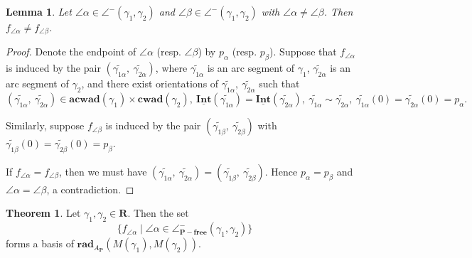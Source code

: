 \documentclass[a4paper,10pt]{amsart}
\theoremstyle{plain}          %
\newtheorem{lemma}[theorem]{Lemma}
\theoremstyle{definition}
\newtheorem{thm}[theorem]{Theorem}
\def\PP{\mathbf{P}}
\newcommand{\Intv}{\underline{\mathbf{Int}}}
\newcommand{\apfree}{\angle^-_{\mathbf{P-free}}}
\newcommand{\aad}{\mathbf{acwad}}
\newcommand{\cad}{\mathbf{cwad}}
\begin{document}
\begin{lemma}\label{l:mor determined by angle}
Let $\angle\alpha\in \angle^{-}(\gamma_1,\gamma_2)$  and $\angle \beta\in \angle^{-}(\gamma_1,\gamma_2)$ with $\angle\alpha\neq\angle \beta$. Then $f_{\angle\alpha}\neq f_{\angle \beta}$. 
\end{lemma}
\begin{proof}
Denote the endpoint of $\angle\alpha$ (resp. $\angle\beta$) by $p_\alpha$ (resp.  $p_\beta$).
   Suppose that  $f_{\angle\alpha}$ is induced by the pair $(\widetilde{\gamma_{1\alpha}},~\widetilde{\gamma_{2\alpha}})$, where $\widetilde{\gamma_{1\alpha}}$ is an arc segment of $\gamma_1$,  $\widetilde{\gamma_{2\alpha}}$ is an arc segment of $\gamma_2$, and there exist orientations of  $\widetilde{\gamma_{1\alpha}},~\widetilde{\gamma_{2\alpha}}$  such that 
\[(\widetilde{\gamma_{1\alpha}},~\widetilde{\gamma_{2\alpha}})\in\aad(\gamma_1)\times\cad(\gamma_2), ~\Intv(\widetilde{\gamma_{1\alpha}})=\Intv(\widetilde{\gamma_{2\alpha}}), ~\widetilde{\gamma_{1\alpha}}\sim\widetilde{\gamma_{2\alpha}}, ~\widetilde{\gamma_{1\alpha}}(0)=\widetilde{\gamma_{2\alpha}}(0)=p_{\alpha}.\]

Similarly, suppose $f_{\angle\beta}$ is induced by the  pair $(\widetilde{\gamma_{1\beta}},~\widetilde{\gamma_{2\beta}})$ with $\widetilde{\gamma_{1\beta}}(0)=\widetilde{\gamma_{2\beta}}(0)=p_{\beta}.$

If $f_{\angle\alpha}=f_{\angle\beta}$, then we must have
$(\widetilde{\gamma_{1\alpha}},~\widetilde{\gamma_{2\alpha}})=(\widetilde{\gamma_{1\beta}},~\widetilde{\gamma_{2\beta}})$.
Hence $p_{\alpha}=p_{\beta}$ and $\angle\alpha=\angle\beta$, a contradiction.
\end{proof}



\begin{thm}\label{t:basis of rad fromed by angles}
Let $\gamma_1,\gamma_2\in\mathbf{R}$. Then the set
$$\{f_{\angle\alpha}\mid\angle\alpha\in \apfree(\gamma_1,\gamma_2)\}$$
forms a basis of $\mathbf{rad}_{A_\PP}(M(\gamma_1),M(\gamma_2))$.
\end{thm}
\end{document}
